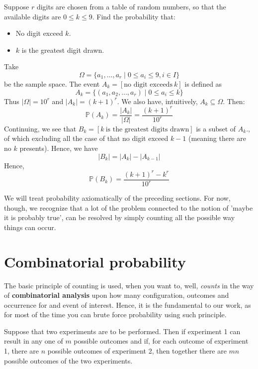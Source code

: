 \begin{example}
    Suppose $r$ digits are chosen from a table of random numbers, so that the available digits are $0\leq k\leq 9$. Find the probability that:
    \begin{itemize}[noitemsep,topsep=0pt]
        \item No digit exceed $k$.
        \item $k$ is the greatest digit drawn. 
    \end{itemize}
    Take $$\Omega=\{ a_{1},\dots,a_{r}\mid 0 \leq a_{i} \leq 9, i \in I \}$$
    be the sample space. The event $A_{k}=[\text{no digit exceeds}\: k]$ is defined as $$A_{k}=\{ (a_{1},a_{2},\dots,a_{r}) \mid 0 \leq a_{i}\leq k\}$$
    Thus $\lvert \Omega \rvert=10^{r}$ and $\lvert A_{k} \rvert=(k+1)^{r}$. We also have, intuitively, $A_{k}\subseteq \Omega$. Then: 
    $$\mathbb{P}(A_{k})=\frac{\lvert A_{k} \rvert }{\lvert \Omega \rvert }=\frac{(k+1)^{r}}{10^{r}}$$
    Continuing, we see that $B_{k}=[k\:\text{is the greatest digits drawn}]$ is a subset of $A_{k}$., of which excluding all the case of that no digit exceed $k-1$ (meaning there are no $k$ presents). Hence, we have $$\lvert B_{k} \rvert =\lvert A_{k} \rvert -\lvert A_{k-1} \rvert $$
    Hence, $$\mathbb{P}(B_{k})= \frac{(k+1)^{r}-k^{r}}{10^{r}}$$    
\end{example}

We will treat probability axiomatically of the preceding sections. For now, though, we recognize that a lot of the problem connected to the notion of 'maybe it is probably true', can be resolved by simply counting all the possible way things can occur. 
\section{Combinatorial probability}
The basic principle of counting is used, when you want to, well, \textit{counts} in the way of \textbf{combinatorial analysis} upon how many configuration, outcomes and occurrence for and event of interest. Hence, it is the fundamental to our work, as for most of the time you can brute force probability using such principle. 
\begin{definition}
    Suppose that two experiments are to be performed. Then if experiment 1 can result in any one of $m$ possible outcomes and if, for each outcome of experiment 1, there are $n$ possible outcomes of experiment 2, then together there are $mn$ possible outcomes of the two experiments. 
\end{definition}

